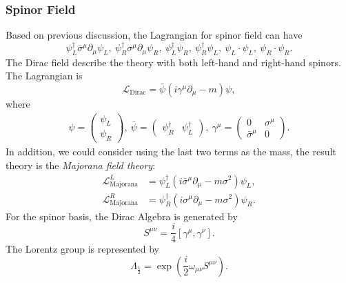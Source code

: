 \subsubsection{Spinor Field}

Based on previous discussion, the Lagrangian for spinor field can have
\begin{equation}
	\psi_L^\dagger \bar\sigma^\mu \partial_\mu \psi_L,\ 
	\psi_R^\dagger \sigma^\mu \partial_\mu \psi_R,\ 
	\psi_L^\dagger \psi_R,\ \psi_R^\dagger \psi_L,\ 
	\psi_L \cdot \psi_L,\ \psi_R \cdot \psi_R.
\end{equation}
The Dirac field describe the theory with both left-hand and right-hand spinors.
The Lagrangian is
\begin{equation}
	\mathcal{L}_{\mathrm{Dirac}}
	= \bar\psi \left(i\gamma^\mu \partial_\mu - m\right)\psi,
\end{equation}
where
\begin{eqnarray}
	\psi = \left(\begin{array}{c}
		\psi_L \\ \psi_R
	\end{array}\right),\ 
	\bar\psi = \left(\begin{array}{cc}
		\psi_R^\dagger & \psi_L^\dagger
	\end{array}\right),\ 
	\gamma^\mu = \left(\begin{array}{cc}
		0 & \sigma^\mu \\
		\bar\sigma^\mu & 0
	\end{array}\right).
\end{eqnarray}
In addition, we could consider using the last two terms as the mass, the result theory is the \textit{Majorana field theory}:
\begin{equation}
\begin{aligned}
	\mathcal{L}^{L}_{\mathrm{Majorana}}
	&= \psi_L^\dagger \left(i\bar\sigma^\mu \partial_\mu -m \sigma^2 \right) \psi_L, \\
	\mathcal{L}^{R}_{\mathrm{Majorana}}
	&= \psi_R^\dagger \left(i\sigma^\mu \partial_\mu -m \sigma^2 \right) \psi_R. 
\end{aligned}
\end{equation} 
For the spinor basis, the Dirac Algebra is generated by
\begin{equation}\label{eq:qft-diract-generator}
	S^{\mu\nu} = \frac{i}{4}[\gamma^\mu, \gamma^\nu].
\end{equation}
The Lorentz group is represented by
\begin{equation}\label{eq:qft-dirac-rep}
	\Lambda_{\frac{1}{2}} = \exp\left(\frac{i}{2}\omega_{\mu\nu} S^{\mu\nu}\right).
\end{equation}
